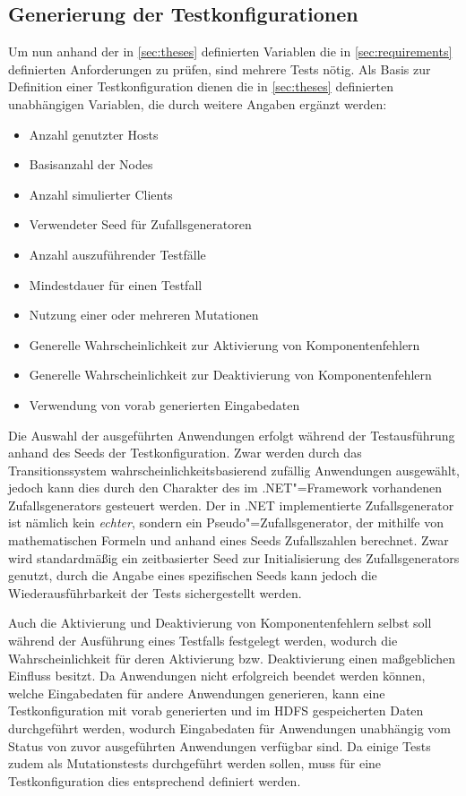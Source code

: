 \subsection{Generierung der Testkonfigurationen}
\label{sec:testcaseGeneration}

Um nun anhand der in \autoref{sec:theses} definierten Variablen die in \autoref{sec:requirements} definierten Anforderungen zu prüfen, sind mehrere Tests nötig.
Als Basis zur Definition einer Testkonfiguration dienen die in \autoref{sec:theses} definierten unabhängigen Variablen, die durch weitere Angaben ergänzt werden:

\begin{itemize}
    \item Anzahl genutzter Hosts
    \item Basisanzahl der Nodes
    \item Anzahl simulierter Clients
    \item Verwendeter Seed für Zufallsgeneratoren
    \item Anzahl auszuführender Testfälle
    \item Mindestdauer für einen Testfall
    \item Nutzung einer oder mehreren Mutationen
    \item Generelle Wahrscheinlichkeit zur Aktivierung von Komponentenfehlern
    \item Generelle Wahrscheinlichkeit zur Deaktivierung von Komponentenfehlern
    \item Verwendung von vorab generierten Eingabedaten
\end{itemize}

Die Auswahl der ausgeführten Anwendungen erfolgt während der Testausführung anhand des Seeds der Testkonfiguration.
Zwar werden durch das Transitionssystem wahrscheinlichkeitsbasierend zufällig Anwendungen ausgewählt, jedoch kann dies durch den Charakter des im .NET"=Framework vorhandenen Zufallsgenerators gesteuert werden.
Der in .NET implementierte Zufallsgenerator ist nämlich kein \emph{echter}, sondern ein Pseudo"=Zufallsgenerator, der mithilfe von mathematischen Formeln und anhand eines Seeds Zufallszahlen berechnet.
Zwar wird standardmäßig ein zeitbasierter Seed zur Initialisierung des Zufallsgenerators genutzt, durch die Angabe eines spezifischen Seeds kann jedoch die Wiederausführbarkeit der Tests sichergestellt werden.

Auch die Aktivierung und Deaktivierung von Komponentenfehlern selbst soll während der Ausführung eines Testfalls festgelegt werden, wodurch die Wahrscheinlichkeit für deren Aktivierung bzw. Deaktivierung einen maßgeblichen Einfluss besitzt.
Da Anwendungen \uU nicht erfolgreich beendet werden können, welche Eingabedaten für andere Anwendungen generieren, kann eine Testkonfiguration mit vorab generierten und im \ac{HDFS} gespeicherten Daten durchgeführt werden, wodurch Eingabedaten für Anwendungen unabhängig vom Status von zuvor ausgeführten Anwendungen verfügbar sind.
Da einige Tests zudem als Mutationstests durchgeführt werden sollen, muss für eine Testkonfiguration dies entsprechend definiert werden.

